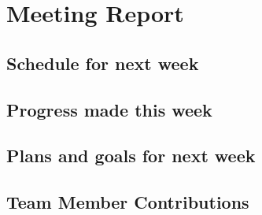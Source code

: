 \documentclass[12pt]{article}
\begin{document}
\section{Meeting Report}
\subsection{Schedule for next week}

\subsection{Progress made this week}

\subsection{Plans and goals for next week}
\subsection{Team Member Contributions}
\end{document}
